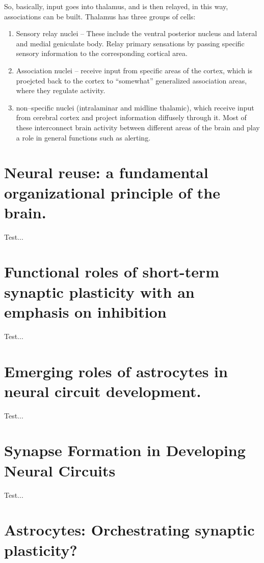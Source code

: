 \documentclass[11pt, a4paper, oneside]{article}   	%
\begin{document}
So, basically, input goes into thalamus, and is then relayed, in this way, associations can be built. Thalamus has three groups of cells:
\begin{enumerate}
\item Sensory relay nuclei -- These include the ventral posterior nucleus and lateral and medial geniculate body. Relay primary sensations by passing specific sensory information to the corresponding cortical area. 
\item Association nuclei -- receive input from specific areas of the cortex, which is proejcted back to the cortex to ``somewhat'' generalized association areas, where they regulate activity.
\item non--specific nuclei (intralaminar and midline thalamic), which receive input from cerebral cortex and project information diffusely through it. Most of these interconnect brain activity between different areas of the brain and play a role in general functions such as alerting.
\end{enumerate}


\section{Neural reuse: a fundamental organizational principle of the brain. \cite{Anderson2010}}

Test...

\section{Functional roles of short-term synaptic plasticity with an emphasis on inhibition \cite{Anwar2017}}

Test...

\section{Emerging roles of astrocytes in neural circuit development. \cite{Clarke2013}}

Test...

\section{Synapse Formation in Developing Neural Circuits \cite{Colon-Ramos2009}}

Test...

\section{Astrocytes: Orchestrating synaptic plasticity? \cite{DePitta2016}}
\end{document}
